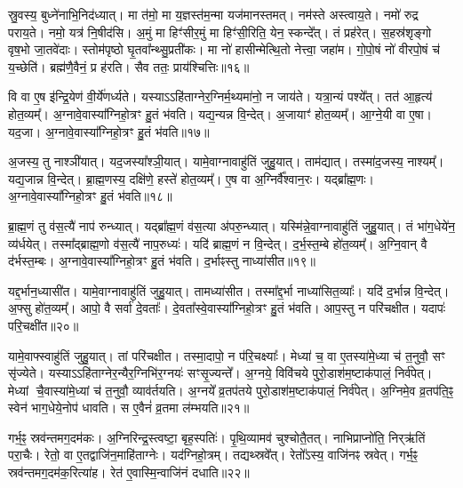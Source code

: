 स्रु॒वस्य॒ बुध्ने॑नाभि॒निद॑ध्यात्।
मा त॑मो॒ मा य॒ज्ञस्त॑म॒न्मा यज॑मानस्तमत्।
नम॑स्ते अस्त्वाय॒ते।
नमो॑ रुद्र पराय॒ते।
नमो॒ यत्र॑ नि॒षीद॑सि।
अ॒मुं मा हिꣳ॑सीर॒मुं मा हिꣳ॑सी॒रिति॒ येन॒ स्कन्दे᳚त्।
तं प्रह॑रेत्।
स॒हस्र॑शृङ्गो वृष॒भो जा॒तवे॑दाः।
स्तोम॑पृष्ठो घृ॒तवा᳚न्थ्सु॒प्रती॑कः।
मा नो॑ हासीन्मेत्थि॒तो नेत्त्वा॒ जहा॑म।
गो॒पो॒षं नो॑ वीरपो॒षं च॑ य॒च्छेति॑।
ब्रह्म॑णै॒वैनं॒ प्र ह॑रति।
सैव ततः॒ प्राय॑श्चित्तिः॥१६॥\ip{}

वि वा ए॒ष इ॑न्द्रि॒येण॑ वी॒र्ये॑णर्ध्यते।
यस्याऽऽहि॑ताग्ने\-र॒ग्निर्म॒थ्य\-मा॑नो॒ न जाय॑ते।
यत्रा॒न्यं पश्ये᳚त्।
तत॑ आ॒हृत्य॑ होत॒व्यम्᳚।
अ॒ग्नावे॒वास्या᳚ग्निहो॒त्रꣳ हु॒तं भ॑वति।
यद्य॒न्यन्न वि॒न्देत्।
अ॒जायाꣳ॑ होत॒व्यम्᳚।
आ॒ग्ने॒यी वा ए॒षा।
यद॒जा।
अ॒ग्नावे॒वास्या᳚ग्निहो॒त्रꣳ हु॒तं भ॑वति॥१७॥\ip

अ॒जस्य॒ तु नाश्ञी॑यात्।
यद॒जस्या᳚श्ञी॒यात्।
यामे॒वाग्नावाहु॑तिं जुहु॒यात्।
ताम॑द्यात्।
तस्मा॑द॒जस्य॒ नाश्यम्᳚।
यद्य॒जान्न वि॒न्देत्।
ब्रा॒ह्म॒णस्य॒ दक्षि॑णे॒ हस्ते॑ होत॒व्यम्᳚।
ए॒ष वा अ॒ग्निर्वै᳚श्वान॒रः।
यद्ब्रा᳚ह्म॒णः।
अ॒ग्नावे॒वास्या᳚ग्निहो॒त्रꣳ हु॒तं भ॑वति॥१८॥\ip

ब्रा॒ह्म॒णं तु व॑स॒त्यै॑ नाप॑ रुन्ध्यात्।
यद्ब्रा᳚ह्म॒णं व॑स॒त्या अ॑परु॒न्ध्यात्।
यस्मि॑न्ने॒वाग्नावाहु॑तिं जुहु॒यात्।
तं भा॑ग॒धेये॑न॒ व्य॑र्धयेत्।
तस्मा᳚द्ब्राह्म॒णो व॑स॒त्यै॑ नाप॒रुध्यः॑।
यदि॑ ब्राह्म॒णं न वि॒न्देत्।
द॒र्भ॒स्त॒म्बे हो॑त॒व्यम्᳚।
अ॒ग्नि॒वान् वै द॑र्भस्त॒म्बः।
अ॒ग्नावे॒वास्या᳚ग्निहो॒त्रꣳ हु॒तं भ॑वति।
द॒र्भाꣴस्तु नाध्या॑सीत॥१९॥\ip

यद्द॒र्भान॒ध्यासी॑त।
यामे॒वाग्नावाहु॑तिं जुहु॒यात्।
तामध्या॑सीत।
तस्मा᳚द्द॒र्भा नाध्या॑सित॒व्याः᳚।
यदि॑ द॒र्भान्न वि॒न्देत्।
अ॒फ्सु हो॑त॒व्यम्᳚।
आपो॒ वै सर्वा॑ दे॒वताः᳚।
दे॒वता᳚स्वे॒वास्या᳚ग्निहो॒त्रꣳ हु॒तं भ॑वति।
आप॒स्तु न परि॑चक्षीत।
यदापः॑ परि॒चक्षी॑त॥२०॥\ip

यामे॒वाफ्स्वाहु॑तिं जुहु॒यात्।
तां परि॑चक्षीत।
तस्मा॒दापो॒ न प॑रि॒चक्ष्याः᳚।
मेध्या॑ च॒ वा ए॒तस्या॑मे॒ध्या च॑ त॒नुवौ॒ सꣳ सृ॑ज्येते।
यस्याऽऽहि॑ताग्नेर॒न्यैर॒ग्निभि॑र॒ग्नयः॑ सꣳसृ॒ज्यन्ते᳚।
अ॒ग्नये॒ विवि॑चये पुरो॒डाश॑म॒ष्टा\-क॑पालं॒ निर्व॑पेत्।
मेध्यां चै॒वास्या॑मे॒ध्यां च॑ त॒नुवौ॒ व्याव॑र्तयति।
अ॒ग्नये᳚ व्र॒तप॑तये पुरो॒डाश॑म॒ष्टा\-क॑पालं॒ निर्व॑पेत्।
अ॒ग्निमे॒व व्र॒तप॑ति॒ꣴ॒ स्वेन॑ भाग॒\-धेये॒नोप॑ धावति।
स ए॒वैनं॑ व्र॒तमा ल॑म्भयति॥२१॥\ip

गर्भ॒ꣴ॒ स्रव॑न्तमग॒दम॑कः।
अ॒ग्निरिन्द्र॒स्त्वष्टा॒ बृह॒स्पतिः॑।
पृ॒थि॒व्यामव॑ चुश्चोतै॒तत्।
नाभि\-प्राप्नो॑ति॒ निर्‌\mbox{}ऋ॑तिं परा॒चैः।
रेतो॒ वा ए॒तद्वाजि॑न॒माहि॑ताग्नेः।
यद॑ग्निहो॒त्रम्।
तद्यथ्स्रवे᳚त्।
रेतो᳚\-ऽस्य॒ वाजि॑नꣴ स्रवेत्।
गर्भ॒ꣴ॒ स्रव॑न्तमग॒दम॑क॒रित्या॑ह।
रेत॑ ए॒वास्मि॒न्वाजि॑नं दधाति॥२२॥\ip


